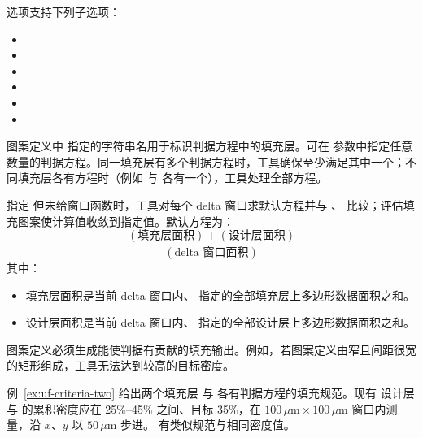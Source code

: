  选项支持下列子选项：
\begin{itemize}
  \item {}
  \item {}
  \item {}
  \item {}
  \item {}
  \item {}
\end{itemize}

图案定义中  指定的字符串名用于标识判据方程中的填充层。可在  参数中指定任意数量的判据方程。同一填充层有多个判据方程时，工具确保至少满足其中一个；不同填充层各有方程时（例如  与  各有一个），工具处理全部方程。

指定  但未给窗口函数时，工具对每个 delta 窗口求默认方程并与 、 比较；评估填充图案使计算值收敛到指定值。默认方程为：
\[
\frac{(\text{填充层面积}) + (\text{设计层面积})}{(\text{delta 窗口面积})}
\]
其中：
\begin{itemize}
  \item 填充层面积是当前 delta 窗口内、 指定的全部填充层上多边形数据面积之和。
  \item 设计层面积是当前 delta 窗口内、 指定的全部设计层上多边形数据面积之和。
\end{itemize}

\begin{noteBox}
图案定义必须生成能使判据有贡献的填充输出。例如，若图案定义由窄且间距很宽的矩形组成，工具无法达到较高的目标密度。
\end{noteBox}

例~\ref{ex:uf-criteria-two} 给出两个填充层  与  各有判据方程的填充规范。现有  设计层与  的累积密度应在 25\%--45\% 之间、目标 35\%，在 $100\,\mu\mathrm{m} \times 100\,\mu\mathrm{m}$ 窗口内测量，沿 $x$、$y$ 以 $50\,\mu\mathrm{m}$ 步进。 有类似规范与相同密度值。

